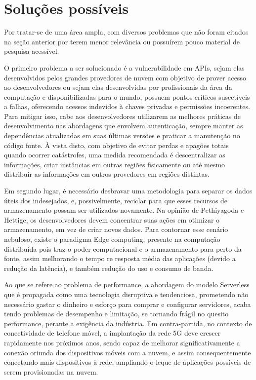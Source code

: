 \documentclass[12pt]{article}
\begin{document}
\section{Soluções possíveis}
Por tratar-se de uma área ampla, com diversos problemas que não foram citados na seção anterior por terem menor relevância ou possuírem pouco material de pesquisa acessível.

O primeiro problema a ser solucionado é a vulnerabilidade em APIs, sejam elas desenvolvidos pelos grandes provedores de nuvem com objetivo de prover acesso ao desenvolvedores ou sejam elas desenvolvidas por profissionais da área da computação e disponibilizadas para o mundo, possuem pontos críticos suscetíveis a falhas, oferecendo acessos indevidos à chaves privadas e permissões incoerentes. Para mitigar isso, cabe aos desenvolvedores utilizarem as melhores práticas de desenvolvimento nas abordagens que envolvem autenticação, sempre manter as dependências atualizadas em suas últimas versões e praticar a manutenção no código fonte. À vista disto, com objetivo de evitar perdas e apagões totais quando ocorrer catástrofes, uma medida recomendada é descentralizar as informações, criar instâncias em outras regiões fisicamente ou até mesmo distribuir as informações em outros provedores em regiões distintas.

Em segundo lugar, é necessário desbravar uma metodologia para separar os dados úteis dos indesejados, e, possivelmente, reciclar para que esses recursos de armazenamento possam ser utilizados novamente. Na opinião de Pethiyagoda e Hettige, os desenvolvedores devem concentrar suas ações em otimizar o armazenamento, em vez de criar novos dados. Para contornar esse cenário nebuloso, existe o paradigma Edge computing, presente na computação distribuída pois traz o poder computacional e o armazenamento para perto da fonte, assim melhorando o tempo re resposta média das aplicações (devido a redução da latência), e também redução do uso e consumo de banda.

Ao que se refere ao problema de performance, a abordagem do modelo Serverless que é propagada como uma tecnologia disruptiva e tendenciosa, prometendo não necessário gastar o dinheiro e esforço para comprar e configurar servidores, acaba tendo problemas de desempenho e limitação, se tornando frágil no quesito performance, perante a exigência da indústria. Em contra-partida, no contexto de conectividade de telefone móvel, a implantação da rede 5G deve crescer rapidamente nos próximos anos, sendo capaz de melhorar significativamente a conexão oriunda dos dispositivos móveis com a nuvem, e assim consequentemente conectando mais dispositivos à rede, ampliando o leque de aplicações possíveis de serem provisionadas na nuvem.
\nocite{*}
\medskip



\end{document}
